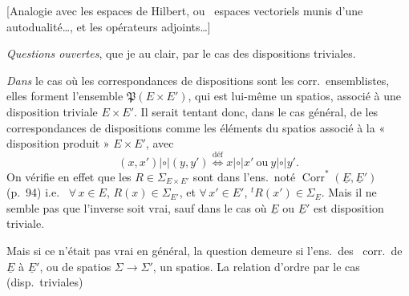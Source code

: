 \documentclass[11pt,a4paper]{article}
\begin{document}
[Analogie avec les espaces de Hilbert, ou \ espaces vectoriels munis d'une autodualité\ldots, et les opérateurs adjoints\ldots]

\emph{Questions ouvertes}, que je  au clair,  par le cas des dispositions triviales.


\emph{Dans} le cas où les correspondances de dispositions sont les corr.\ ensemblistes, elles forment l'ensemble $\mathfrak{P}(E \times E')$, qui est lui-même un  spatios, associé à une disposition triviale $E \times E'$. Il serait tentant donc, dans le cas général, de  les correspondances de dispositions  comme  les éléments du spatios associé à la « disposition produit » $E \times E'$, avec
\[
  (x, x') \mathrel{|\circ|} (y, y') \overset{\text{déf}}{\iff} x \mathrel{|\circ|} x' \ \text{ou}\ y \mathrel{|\circ|} y' .
\]
On vérifie en effet que les  $R \in \Sigma_{E \times E'}$ sont dans l'ens.\ noté $\operatorname{Corr}^{*}(\underline{E}, \underline{E}')$ (p.~94) i.e.\ \struck{$\forall\,$} $\forall\, x \in E$, $R(x) \in \Sigma_{E'}$, et $\forall\, x' \in E'$, ${}^{t}R(x') \in \Sigma_E$. Mais il ne semble pas que l'inverse soit vrai, sauf dans le cas où $\underline{E}$ ou $\underline{E}'$ est  disposition triviale.

Mais si ce n'était pas vrai en général, la question demeure si l'ens.\ des \ corr.\ de $\underline{E}$ à $\underline{E}'$, ou   de spatios $\Sigma \to \Sigma'$,  un spatios. La relation d'ordre  par le cas  (disp.\ triviales) 
\end{document}
